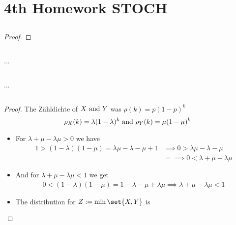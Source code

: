 
\section{4th Homework STOCH}
\subsection{}
\begin{proof}
	
\end{proof}

\subsection{}
\begin{solution}
	...
\end{solution}
\subsection{}
\begin{solution}
	...
\end{solution}
\subsection{}
\begin{proof}
	The Zähldichte of $X \text{ and } Y$ was $\rho(k) = p(1-p)^k$
	\begin{align*}
		\rho_X(k) = \lambda(1-\lambda)^k \text{ and } \rho_Y (k) = \mu(1-\mu)^k
	\end{align*}
	\begin{itemize}
		\item For $\lambda + \mu -\lambda \mu > 0$ we have
		\begin{align*}
			1 > (1-\lambda)(1-\mu) = \lambda \mu -\lambda -\mu + 1 &\implies 0 > \lambda \mu - \lambda - \mu\\
			&= \implies 0 < \lambda + \mu - \lambda \mu
		\end{align*}
		\item And for $\lambda + \mu - \lambda \mu < 1$ we get
		\begin{align*}
			0 < (1-\lambda)(1-\mu) = 1 - \lambda - \mu + \lambda\mu \implies \lambda + \mu - \lambda \mu < 1
		\end{align*}
		\item The distribution for $Z := \min\set{X,Y}$ is
	\end{itemize}
\end{proof}

